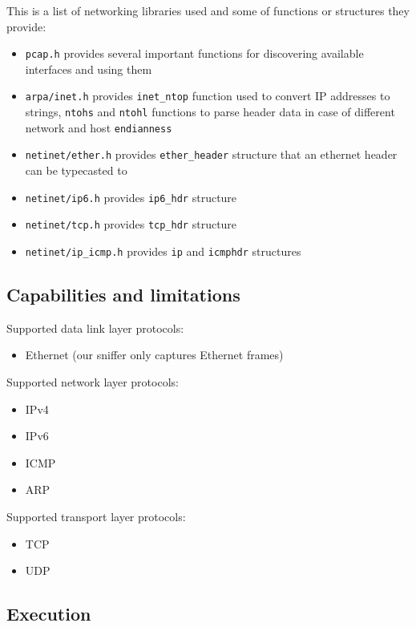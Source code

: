 \documentclass[a4paper]{article}
\begin{document}
  This is a list of networking libraries used and some of functions or 
  structures they provide:
  \begin{itemize}
    \item \verb|pcap.h| provides several important functions for discovering
      available interfaces and using them
    \item \verb|arpa/inet.h| provides \verb|inet_ntop| function used to 
      convert IP addresses to strings, \verb|ntohs| and \verb|ntohl|
      functions to parse header data in case of different network and host 
      \verb|endianness|
    \item \verb|netinet/ether.h| provides \verb|ether_header| structure
      that an ethernet header can be typecasted to
    \item \verb|netinet/ip6.h| provides \verb|ip6_hdr| structure
    \item \verb|netinet/tcp.h| provides \verb|tcp_hdr| structure
    \item \verb|netinet/ip_icmp.h| provides \verb|ip| and \verb|icmphdr|
      structures
  \end{itemize}


  \subsection{Capabilities and limitations}

  Supported data link layer protocols:
  \begin{itemize}
    \item Ethernet (our sniffer only captures Ethernet frames)
  \end{itemize}

  \noindent
  Supported network layer protocols:
  \begin{itemize}
    \item IPv4
    \item IPv6
    \item ICMP
    \item ARP
  \end{itemize}

  \noindent
  Supported transport layer protocols:
  \begin{itemize}
    \item TCP
    \item UDP
  \end{itemize}


  \subsection{Execution}
\end{document}
